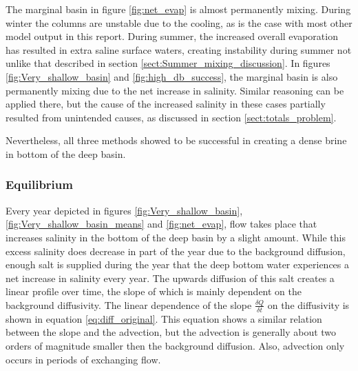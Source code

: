 \documentclass[twocolumn]{article}
\begin{document}
The marginal basin in figure \ref{fig:net_evap} is almost permanently mixing. During winter the columns are unstable due to the cooling, as is the case with most other model output in this report. During summer, the increased overall evaporation has resulted in extra saline surface waters, creating instability during summer not unlike that described in section \ref{sect:Summer_mixing_discussion}. In figures \ref{fig:Very_shallow_basin} and \ref{fig:high_db_success}, the marginal basin is also permanently mixing due to the net increase in salinity. Similar reasoning can be applied there, but the cause of the increased salinity in these cases partially resulted from unintended causes, as discussed in section \ref{sect:totals_problem}. 


Nevertheless, all three methods showed to be successful in creating a dense brine in bottom of the deep basin.

\subsubsection{Equilibrium}
Every year depicted in figures \ref{fig:Very_shallow_basin}, \ref{fig:Very_shallow_basin_means} and \ref{fig:net_evap}, flow takes place that increases salinity in the bottom of the deep basin by a slight amount. While this excess salinity does decrease in part of the year due to the background diffusion, enough salt is supplied during the year that the deep bottom water experiences a net increase in salinity every year. The upwards diffusion of this salt creates a linear profile over time, the slope of which is mainly dependent on the background diffusivity. The linear dependence of the slope $\frac{\delta Q}{\delta t}$ on the diffusivity is shown in equation \ref{eq:diff_original}. This equation shows a similar relation between the slope and the advection, but the advection is generally about two orders of magnitude smaller then the background diffusion. Also, advection only occurs in periods of exchanging flow. 
\end{document}
